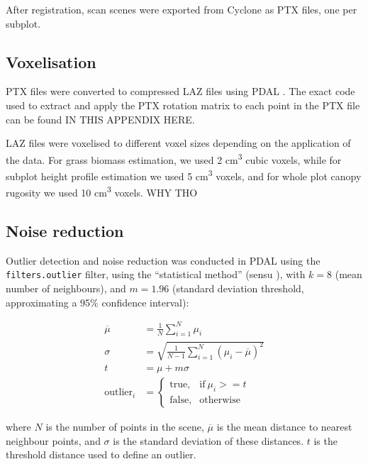 \documentclass[11pt,a4paper]{article}
\begin{document}
After registration, scan scenes were exported from Cyclone as PTX files, one per subplot.

\subsection{Voxelisation}

PTX files were converted to compressed LAZ files using PDAL \citep{}. The exact code used to extract and apply the PTX rotation matrix to each point in the PTX file can be found IN THIS APPENDIX HERE. 

LAZ files were voxelised to different voxel sizes depending on the application of the data. For grass biomass estimation, we used 2 cm\textsuperscript{3} cubic voxels, while for subplot height profile estimation we used 5 cm\textsuperscript{3} voxels, and for whole plot canopy rugosity we used 10 cm\textsuperscript{3} voxels. WHY THO

\subsection{Noise reduction}

Outlier detection and noise reduction was conducted in PDAL using the \texttt{filters.outlier} filter, using the ``statistical method'' (sensu \citealt{Rusu2008}), with $k = 8$ (mean number of neighbours), and $m = 1.96$ (standard deviation threshold, approximating a 95\% confidence interval):

\begin{align}
	\overline{\mu} &= \frac{1}{N} \sum_{i=1}^{N} \mu_{i} \\
	\sigma &= \sqrt{\frac{1}{N-1} \sum_{i=1}^{N}(\mu_{i} - \overline{\mu{}})^2} \\
	t &= \mu + m \sigma \\
	\text{outlier}_{i} &= 
		\begin{cases}
			\text{true}, & \text{if}\ \mu_{i} >= t \\
			\text{false}, & \text{otherwise}
		\end{cases}
\end{align}

where $N$ is the number of points in the scene, $\overline{\mu}$ is the mean distance to nearest neighbour points, and $\sigma$ is the standard deviation of these distances. $t$ is the threshold distance used to define an outlier.
\end{document}
